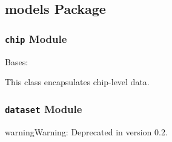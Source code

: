 \documentclass[letterpaper,10pt,english]{sphinxmanual}
\begin{document}
\subsection{models Package}
\label{qikify.models::doc}\label{qikify.models:models-package}

\subsubsection{\texttt{chip} Module}
\label{qikify.models:chip-module}\label{qikify.models:module-qikify.models.chip}

\begin{fulllineitems}
\label{qikify.models:qikify.models.chip.Chip}
Bases: 

This class encapsulates chip-level data.

\end{fulllineitems}



\subsubsection{\texttt{dataset} Module}
\label{qikify.models:module-qikify.models.dataset}\label{qikify.models:dataset-module}
\begin{notice}{warning}{Warning:}
Deprecated in version 0.2.
\end{notice}
\end{document}
